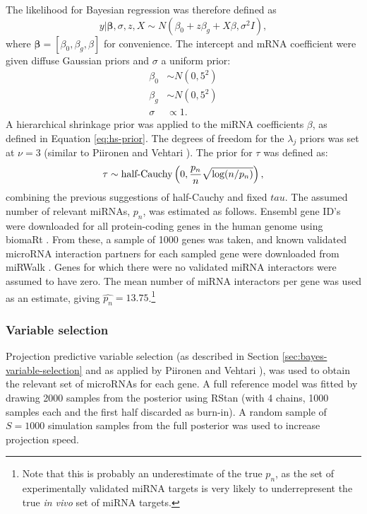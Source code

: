 The likelihood for Bayesian regression was therefore defined as
\begin{equation}
	y | \mathbf{\beta}, \sigma, z, X \sim N(\beta_0 + z \beta_g + X \beta, \sigma^2I),
\end{equation}
where $\mathbf{\beta} = [\beta_0, \beta_g, \beta]$ for convenience.
The intercept and mRNA coefficient were given diffuse Gaussian priors
and $\sigma$ a uniform prior:
\begin{subequations}
  \begin{align}
    \beta_0 & \sim N(0, 5^2) \\
    \beta_g & \sim N(0, 5^2) \\
    \sigma  & \propto 1.
  \end{align}
\end{subequations}
A hierarchical shrinkage prior was applied to the miRNA coefficients $\beta$,
as defined in Equation \eqref{eq:hs-prior}. The degrees of freedom for the
$\lambda_j$ priors was set at $\nu=3$ (similar to Piironen and Vehtari
\citep{Piironen2015}). The prior for $\tau$ was defined as:
\begin{equation}
    \tau \sim \textup{half-Cauchy} \left ( 0, \frac{p_n}{n}\sqrt{\textup{log}(n/p_n)} \right ),
\end{equation}
combining the previous suggestions of half-Cauchy and fixed $tau$.
The assumed number of relevant miRNAs, $p_n$, was estimated as follows.
Ensembl gene ID's were downloaded for all protein-coding genes in the human
genome using biomaRt \citep{Durinck2009}. From these, a sample of 1000 genes was
taken, and known validated microRNA interaction partners for each sampled gene
were downloaded from miRWalk \citep{Dweep2015}. Genes for which there were no
validated miRNA interactors were assumed to have zero. The mean number of
miRNA interactors per gene was used as an estimate, giving
$\hat{p_n} = 13.75$.\footnote{Note that this is probably an underestimate of
the true $p_n$, as the set of experimentally validated miRNA targets is
very likely to underrepresent the true \emph{in vivo} set of miRNA targets.}



\subsubsection{Variable selection}\label{sec:methods-variable-selection}

Projection predictive variable selection (as described in Section
\ref{sec:bayes-variable-selection} and as applied by Piironen and Vehtari \citep{Piironen2015}),
was used to obtain the relevant set of microRNAs for each gene. A full
reference model was fitted by drawing 2000 samples from the posterior using
RStan (with 4 chains, 1000 samples each and the first half discarded as burn-in).
A random sample of $S=1000$ simulation samples from the full posterior was used
to increase projection speed.

